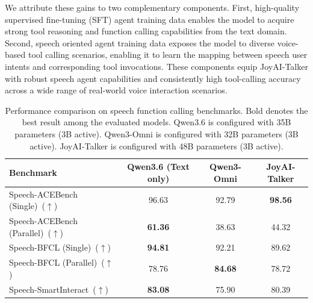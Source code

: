 We attribute these gains to two complementary components. First, high-quality supervised fine-tuning (SFT) agent training data enables the model to acquire strong tool reasoning and function calling capabilities from the text domain. Second, speech oriented agent training data exposes the model to diverse voice-based tool calling scenarios, enabling it to learn the mapping between speech user intents and corresponding tool invocations. These components equip JoyAI-Talker with robust speech agent capabilities and consistently high tool-calling accuracy across a wide range of real-world voice interaction scenarios.

\begin{table}[ht]
\centering
\caption{Performance comparison on speech function calling benchmarks. Bold denotes the best result among the evaluated models. Qwen3.6 is configured with 35B parameters (3B active). Qwen3-Omni is configured with 32B parameters (3B active). JoyAI-Talker is configured with 48B parameters (3B active).}
\label{tab:speech_toolcall_bench}
\small
\begin{tabular}{lccc}
\toprule
\textbf{Benchmark} &
\textbf{Qwen3.6 (Text only)} &
\textbf{Qwen3-Omni} &
\textbf{JoyAI-Talker} \\
\midrule
Speech-ACEBench (Single)~($\uparrow$)    & 96.63 & 92.79 & \textbf{98.56} \\
Speech-ACEBench (Parallel)~($\uparrow$)  & \textbf{61.36} & 38.63 & 44.32 \\
\midrule
Speech-BFCL (Single)~($\uparrow$)        & \textbf{94.81} & 92.21 & 89.62 \\
Speech-BFCL (Parallel)~($\uparrow$)      & 78.76 & \textbf{84.68} & 78.72 \\
\midrule
Speech-SmartInteract~($\uparrow$)        & \textbf{83.08} & 75.90 & 80.39 \\
\bottomrule
\end{tabular}
\end{table}